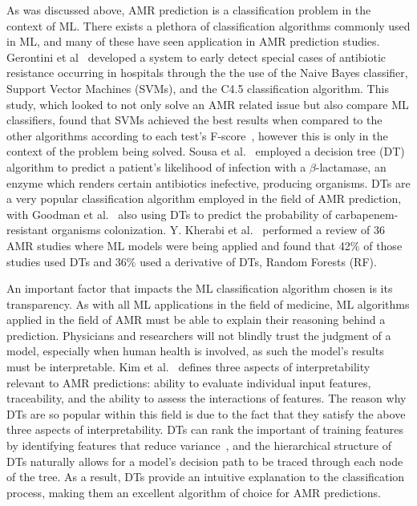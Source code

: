 \documentclass{article}
\begin{document}
As was discussed above, AMR prediction is a classification problem in the context of ML. There exists a plethora of classification algorithms commonly used in ML, and many of these have seen application in AMR prediction studies. Gerontini et al~\cite{gerontini_predictions_2011} developed a system to early detect special cases of antibiotic resistance occurring in hospitals through the the use of the Naive Bayes classifier, Support Vector Machines (SVMs), and the C4.5 classification algorithm. This study, which looked to not only solve an AMR related issue but also compare ML classifiers, found that SVMs achieved the best results when compared to the other algorithms according to each test's F-score~\cite{gerontini_predictions_2011}, however this is only in the context of the problem being solved. Sousa et al.~\cite{sousa_validation_2019} employed a decision tree (DT) algorithm to predict a patient's likelihood of infection with a $\beta$-lactamase, an enzyme which renders certain antibiotics inefective, producing organisms. DTs are a very popular classification algorithm employed in the field of AMR prediction, with Goodman et al.~\cite{goodman_predicting_2019} also using DTs to predict the probability of carbapenem-resistant organisms colonization. Y. Kherabi et al.~\cite{kherabi_machine_2024} performed a review of 36 AMR studies where ML models were being applied and found that 42\% of those studies used DTs and 36\% used a derivative of DTs, Random Forests (RF).  

An important factor that impacts the ML classification algorithm chosen is its transparency. As with all ML applications in the field of medicine, ML algorithms applied in the field of AMR must be able to explain their reasoning behind a prediction. Physicians and researchers will not blindly trust the judgment of a model, especially when human health is involved, as such the model's results must be interpretable. Kim et al.~\cite{kim_machine_2022} defines three aspects of interpretability relevant to AMR predictions: ability to evaluate individual input features, traceability, and the ability to assess the interactions of features. The reason why DTs are so popular within this field is due to the fact that they satisfy the above three aspects of interpretability. DTs can rank the important of training features by identifying features that reduce variance~\cite{kim_machine_2022}, and the hierarchical structure of DTs naturally allows for a model's decision path to be traced through each node of the tree. As a result, DTs provide an intuitive explanation to the classification process, making them an excellent algorithm of choice for AMR predictions. 
\end{document}

